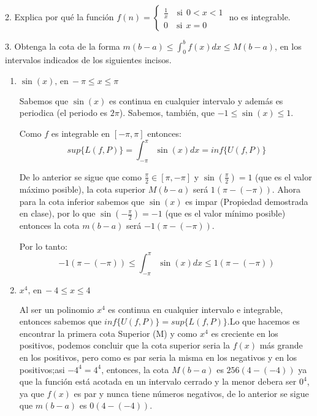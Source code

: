 \documentclass[12pt]{article}
\begin{document}
2. Explica por qu\'e la funci\'on
\(f(n)=
\begin{cases}
    \displaystyle\frac{1}{x} \quad \text{si} \ \ 0<x<1\\
    0 \quad \text{si} \ \ x=0
\end{cases}
\) no es integrable.

3. Obtenga la cota de la forma \(m(b-a) \leq \displaystyle\int_{0}^{b}f(x)dx \leq M(b-a)\), en los intervalos indicados de los siguientes incisos.

\begin{enumerate}[\hspace{9px} a)]
    \item \(\sin(x) \text{, en} \ -\pi \leq x \leq \pi\)\medskip

        Sabemos que $\sin(x)$ es continua en cualquier intervalo y además es periodica (el periodo es $2\pi$). Sabemos, tambi\'en, que $-1\leq \sin(x)\leq 1$.\medskip
        
        Como $f$ es integrable en $[-\pi,\pi]$ entonces: \[sup\{L(f,P)\}=\displaystyle\int_{-\pi}^{\pi}\sin(x)dx=inf\{U(f,P)\}\]
        
        De lo anterior se sigue que como \(\displaystyle\frac{\pi}{2}\in[\pi,-\pi]\) y $\sin\left(\displaystyle\frac{\pi}{2}\right)=1$ (que es el valor m\'aximo posible), la cota superior $M(b-a)$ será $1(\pi-(-\pi))$. Ahora para la cota inferior sabemos que $\sin(x)$ es impar (Propiedad demostrada en clase), por lo que \(\sin\left(-\displaystyle\frac{\pi}{2}\right)=-1\) (que  es el valor m\'inimo posible) entonces la cota $m(b-a)$ será \(-1(\pi-(-\pi))\). \medskip

        Por lo tanto: \[-1(\pi-(-\pi)) \leq \int_{-\pi}^{\pi}\sin(x)dx \leq 1(\pi-(-\pi))\]

    \item \(x^4 \text{, en} \ -4 \leq x \leq 4\)\medskip

        Al ser un polinomio $x^4$ es continua en cualquier intervalo e integrable, entonces sabemos que $inf\{U(f,P)\}=sup\{L(f,P)\}$.Lo que hacemos es encontrar la primera cota Superior (M) y como $x^4$ es creciente en los positivos, podemos concluir que la cota superior seria la $f(x)$ más grande en los positivos, pero como es par seria la misma en los negativos y en los positivos;asi \(-4^4=4^4\), entonces, la cota $M(b-a)$ es $256(4-(-4))$ ya que la función está acotada en un intervalo cerrado y la menor debera ser \(0^4\), ya que $f(x)$ es par y nunca tiene números negativos, de lo anterior se sigue que $m(b-a)$ es $0(4-(-4))$.\medskip


\end{enumerate}
\end{document}

